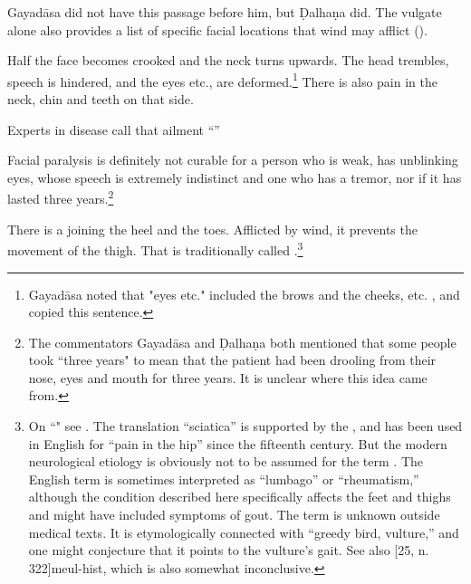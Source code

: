 \begin{translation}
{    Gayadāsa did not have this passage before him, but
    Ḍalhaṇa did.  The vulgate alone also provides a list of specific
    facial locations that wind may afflict ().}


\item[70--71ab]

Half the face becomes crooked and the neck turns upwards.  The head 
trembles, speech is hindered, and the eyes etc., are 
deformed.\footnote{Gayadāsa noted that "eyes etc." included the 
brows and the cheeks, etc. \citep[267]{vulgate}, and  
copied this sentence.} There is also pain in the neck, chin and teeth on that side.

\item[72cd]

Experts in disease call that ailment ``''

\item[73]

Facial paralysis is definitely not curable for a person who is weak,
has unblinking eyes, whose speech is extremely indistinct and one who
has a tremor, nor if it has lasted three years.\footnote{The commentators 
Gayadāsa and Ḍalhaṇa both mentioned that some people took ``three years" to 
mean that the patient had been drooling from their nose, eyes and mouth for 
three years.  It is unclear where this idea came from.}


\item [74]

There is a  joining the heel and the toes. 
Afflicted by wind, it prevents the movement of the thigh. That is
traditionally called .\footnote{On
    ``" see \cite[123, n.\,71]{wuja-2003}.  The
    translation ``sciatica'' is supported by the \citet[128]{who-2022},
    and has been used in English for “pain in the hip” since the fifteenth
    century.  But the modern neurological etiology is obviously not to be
    assumed for the term . The English term is sometimes
    interpreted as ``lumbago'' or “rheumatism,'' although the condition
    described here specifically affects the feet and thighs and might have
    included symptoms of gout. The term  is unknown outside
    medical texts.  It is etymologically connected with 
    ``greedy bird, vulture,'' and one might conjecture that it points to
    the vulture's gait.  See also [25, n.\,322]{meul-hist},
    which is also somewhat inconclusive.}



\end{translation}
